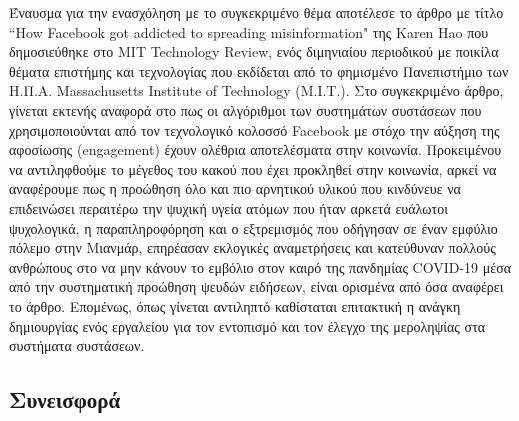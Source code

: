  Έναυσμα για την ενασχόληση με το συγκεκριμένο θέμα αποτέλεσε το άρθρο με τίτλο ``How Facebook got addicted to spreading misinformation" της Karen Hao \cite{haoHowFacebookGot} που δημοσιεύθηκε στο MIT Technology Review, ενός διμηνιαίου περιοδικού με ποικίλα θέματα επιστήμης και τεχνολογίας που εκδίδεται από το φημισμένο Πανεπιστήμιο των Η.Π.Α. Massachusetts Institute of Technology (Μ.Ι.Τ.). Στο συγκεκριμένο άρθρο, γίνεται εκτενής αναφορά στο πως οι αλγόριθμοι των συστημάτων συστάσεων που χρησιμοποιούνται από τον τεχνολογικό κολοσσό Facebook με στόχο την αύξηση της αφοσίωσης (engagement) έχουν ολέθρια αποτελέσματα στην κοινωνία. Προκειμένου να αντιληφθούμε το μέγεθος του κακού που έχει προκληθεί στην κοινωνία, αρκεί να αναφέρουμε πως η προώθηση όλο και πιο αρνητικού υλικού που κινδύνευε να επιδεινώσει περαιτέρω την ψυχική υγεία ατόμων που ήταν αρκετά ευάλωτοι ψυχολογικά, η παραπληροφόρηση και ο εξτρεμισμός που οδήγησαν σε έναν εμφύλιο πόλεμο στην Μιανμάρ, επηρέασαν εκλογικές αναμετρήσεις και κατεύθυναν πολλούς ανθρώπους στο να μην κάνουν το εμβόλιο στον καιρό της πανδημίας COVID-19 μέσα από την συστηματική προώθηση ψευδών ειδήσεων, είναι ορισμένα από όσα αναφέρει το άρθρο. Επομένως, όπως γίνεται αντιληπτό καθίσταται επιτακτική η ανάγκη δημιουργίας ενός εργαλείου για τον εντοπισμό και τον έλεγχο της μεροληψίας στα συστήματα συστάσεων.


\subsection{Συνεισφορά}

